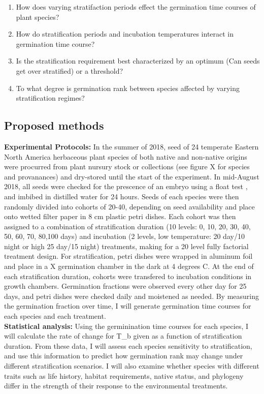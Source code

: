 \documentclass{article}\usepackage[]{graphicx}\usepackage[]{color}
\begin{document}
{{\begin{enumerate}
\item How does varying stratifaction periods effect the germination time courses of plant species?
\item How do stratification periods and incubation temperatures interact in germination time course?
\item Is the stratification requirement best characterized by an optimum (Can seeds get over stratified) or a threshold?
\item To what degree is germination rank between species affected by varying stratification regimes?
\end{enumerate}
\subsection*{Proposed methods}
\textbf{Experimental Protocols:} In the summer of 2018, seed of 24 temperate Eastern North America herbaceous plant species of both native and non-native origins were procurred from plant nursury stock or collections (see figure X for species and provanances) and dry-stored until the start of the experiment. In mid-August 2018, all seeds were checked for the prescence of an embryo using a float test \citep{Baskin_2014}, and imbibed in distilled water for 24 hours. Seeds of each species were then randomly divided into cohorts of 20-40, depending on seed availability and place onto wetted filter paper in 8 cm plastic petri dishes. Each cohort was then assigned to a combination of stratification duration (10 levels: 0, 10, 20, 30, 40, 50, 60, 70, 80,100 days) and incubation (2 levels, low temperature: 20 day/10 night or high 25 day/15 night) treatments, making for a 20 level fully factorial treatment design. For stratification, petri dishes were wrapped in aluminum foil and place in a X germination chamber in the dark at 4 degrees C. At the end of each stratification duration, cohorts were transfered to incubation conditions in growth chambers. Germination fractions were observed every other day for 25 days, and petri dishes were checked daily and moistened as needed. By measuring the germination fraction over time, I will generate germination time courses for each species and each treatment.\\
\textbf{Statistical analysis:} Using the germinination time courses for each species, I will calculate the rate of change for T_b given as a function of stratification duration. From these data, I will assess each species sensitivity to stratification, and use this information to predict how germination rank may change under different stratification scenarios. I will also examine whether species with different traits such as life history, habitat requirements, native status, and phylogeny differ in the strength of their response to the environmental treatments.\\
}}
\end{document}
